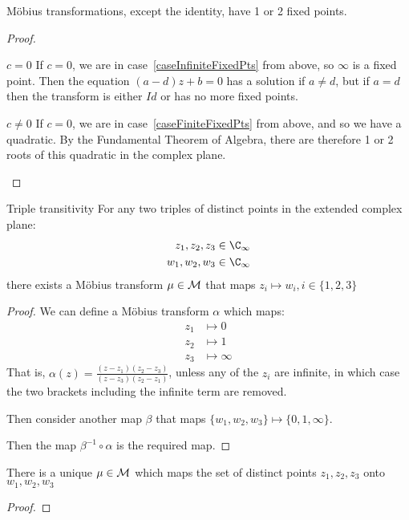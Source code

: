 \documentclass[../Main.tex]{subfiles}
\begin{document}
\begin{corollary}
    M\"obius transformations, except the identity, have 1 or 2 fixed points.
    \label{corNumMobiusFixedPoints}
\end{corollary}
\begin{proof}
    \begin{case}{$c = 0$}
        If $c = 0$, we are in case~\ref{caseInfiniteFixedPts} from above, so $\infty$ is a fixed point. Then the equation $(a - d) z + b = 0$ has a solution if $a \neq d$, but if $a = d$ then the transform is either $Id$ or has no more fixed points.
    \end{case}
    \begin{case}{$c \neq 0$}
        If $c = 0$, we are in case~\ref{caseFiniteFixedPts} from above, and so we have a quadratic. By the Fundamental Theorem of Algebra, there are therefore 1 or 2 roots of this quadratic in the complex plane.
    \end{case}
\end{proof}
\begin{lemma}{Triple transitivity}
    For any two triples of distinct points in the extended complex plane:
    \begin{align*}
        z_1, z_2, z_3 &\in \CInf \\
        w_1, w_2, w_3 &\in \CInf
    \end{align*}
    there exists a M\"obius transform $\mu \in \mathcal{M}$ that maps $z_i \mapsto w_i, i \in \{1, 2, 3\}$
    \label{lemTripleTransitivity}
\end{lemma}
\begin{proof}
    We can define a M\"obius transform $\alpha$ which maps:
    \begin{align*}
        z_1 &\mapsto 0 \\
        z_2 &\mapsto 1 \\
        z_3 &\mapsto \infty
    \end{align*}
    That is, $\alpha(z) = \frac{(z - z_1)(z_2 - z_3)}{(z - z_3)(z_2 - z_1)}$, unless any of the $z_i$ are infinite, in which case the two brackets including the infinite term are removed.\par
    Then consider another map $\beta$ that maps $\{w_1, w_2, w_3\} \mapsto \{0, 1, \infty\}$.\par
    Then the map $\beta^{-1}\circ \alpha$ is the required map.
\end{proof}
\begin{lemma}
    There is a unique $\mu \in \mathcal{M}$ which maps the set of distinct points $z_1, z_2, z_3$ onto $w_1, w_2, w_3$
    \label{lemSharpTripleTransitivity}
\end{lemma}
\begin{proof}
\end{proof}
\end{document}
